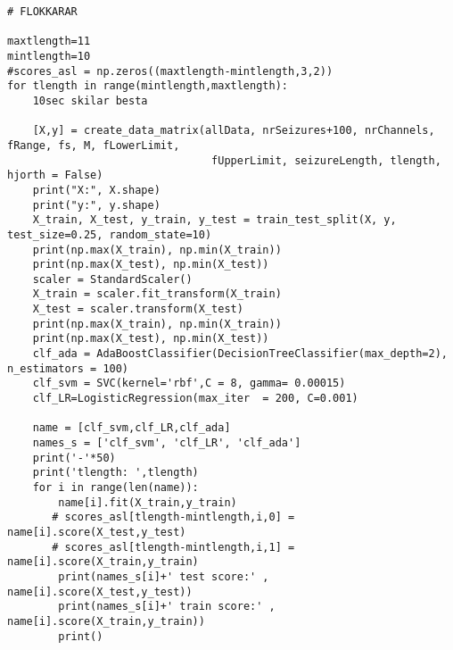 \documentclass[11pt]{article}
\begin{document}
\begin{verbatim}
# FLOKKARAR

maxtlength=11
mintlength=10
#scores_asl = np.zeros((maxtlength-mintlength,3,2))
for tlength in range(mintlength,maxtlength):
    10sec skilar besta

    [X,y] = create_data_matrix(allData, nrSeizures+100, nrChannels, fRange, fs, M, fLowerLimit,
                                fUpperLimit, seizureLength, tlength, hjorth = False)
    print("X:", X.shape)
    print("y:", y.shape)
    X_train, X_test, y_train, y_test = train_test_split(X, y, test_size=0.25, random_state=10)
    print(np.max(X_train), np.min(X_train))
    print(np.max(X_test), np.min(X_test))
    scaler = StandardScaler()
    X_train = scaler.fit_transform(X_train)
    X_test = scaler.transform(X_test)
    print(np.max(X_train), np.min(X_train))
    print(np.max(X_test), np.min(X_test))
    clf_ada = AdaBoostClassifier(DecisionTreeClassifier(max_depth=2), n_estimators = 100)
    clf_svm = SVC(kernel='rbf',C = 8, gamma= 0.00015)
    clf_LR=LogisticRegression(max_iter  = 200, C=0.001)

    name = [clf_svm,clf_LR,clf_ada]
    names_s = ['clf_svm', 'clf_LR', 'clf_ada']
    print('-'*50)
    print('tlength: ',tlength)
    for i in range(len(name)):
        name[i].fit(X_train,y_train)
       # scores_asl[tlength-mintlength,i,0] = name[i].score(X_test,y_test)
       # scores_asl[tlength-mintlength,i,1] = name[i].score(X_train,y_train)
        print(names_s[i]+' test score:' , name[i].score(X_test,y_test))
        print(names_s[i]+' train score:' , name[i].score(X_train,y_train))
        print()
\end{verbatim}
\newpage
\end{document}
